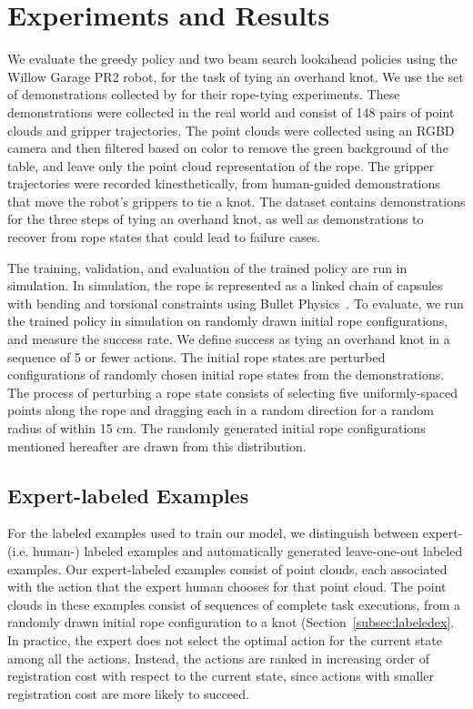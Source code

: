 \section{Experiments and Results}
\label{sec:experiments}

We evaluate the greedy policy and two beam search lookahead policies using the Willow Garage PR2 robot, for the task of tying an overhand knot.
We use the set of demonstrations collected by \citet{Schulmanetal_ISRR2013} for their rope-tying experiments.
These demonstrations were collected in the real world and consist of 148 pairs of point clouds and gripper trajectories.
The point clouds were collected using an RGBD camera and then filtered based on color to remove the green background of the table, and leave only the point cloud representation of the rope.
The gripper trajectories were recorded kinesthetically, from human-guided demonstrations that move the robot's grippers to tie a knot.
The dataset contains demonstrations for the three steps of tying an overhand knot, as well as demonstrations to recover from rope states that could lead to failure cases.

The training, validation, and evaluation of the trained policy are run in simulation.
In simulation, the rope is represented as a linked chain of capsules with bending and torsional constraints using Bullet Physics~\cite{Bullet_Physics}.
To evaluate, we run the trained policy in simulation on randomly drawn initial rope configurations, and measure the success rate. We define success as tying an overhand knot in a sequence of 5 or fewer actions.
The initial rope states are perturbed configurations of randomly chosen initial rope states from the demonstrations.
The process of perturbing a rope state consists of selecting five uniformly-spaced points along the rope and dragging each in a random direction for a random radius of within 15 cm.
The randomly generated initial rope configurations mentioned hereafter are drawn from this distribution.

\subsection{Expert-labeled Examples}
For the labeled examples  used to train our \mmql{} model, we distinguish between expert- (i.e. human-) labeled examples and automatically generated leave-one-out labeled examples.
Our expert-labeled examples consist of point clouds, each associated with the action that the expert human chooses for that point cloud.
The point clouds in these examples consist of sequences of complete task executions, from a randomly drawn initial rope configuration to a knot (Section~\ref{subsec:labeledex}.
In practice, the expert does not select the optimal action for the current state among all the actions.
Instead, the actions are ranked in increasing order of registration cost with respect to the current state, since actions with smaller registration cost are more likely to succeed.

